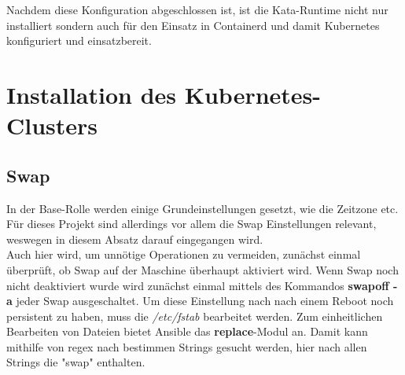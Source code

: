 Nachdem diese Konfiguration abgeschlossen ist, ist die Kata-Runtime nicht nur installiert sondern auch für den Einsatz in Containerd und damit Kubernetes konfiguriert und einsatzbereit.


\section{Installation des Kubernetes-Clusters}

\subsection{Swap}
In der Base-Rolle werden einige Grundeinstellungen gesetzt, wie die Zeitzone etc.
Für dieses Projekt sind allerdings vor allem die Swap Einstellungen relevant, weswegen in diesem Absatz darauf eingegangen wird.
\\
Auch hier wird, um unnötige Operationen zu vermeiden, zunächst einmal überprüft, ob Swap auf der Maschine überhaupt aktiviert wird.
Wenn Swap noch nicht deaktiviert wurde wird zunächst einmal mittels des Kommandos \textbf{swapoff -a} jeder Swap ausgeschaltet.
Um diese Einstellung nach nach einem Reboot noch persistent zu haben, muss die \textit{/etc/fstab} bearbeitet werden.
Zum einheitlichen Bearbeiten von Dateien bietet Ansible das \textbf{replace}-Modul an.
Damit kann mithilfe von \ac{regex} nach bestimmen Strings gesucht werden, hier nach allen Strings die "swap" enthalten.

